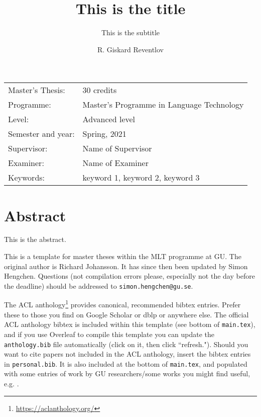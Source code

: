 \documentclass[11pt, a4paper]{article}
\title{This is the title}
\subtitle{This is the subtitle}
\author{R. Giskard Reventlov}
\begin{document}
\begin{titlepage}

\maketitle

\vfill

\begingroup
\renewcommand*{\arraystretch}{1.2}
\begin{tabular}{l@{\hskip 20mm}l}
\hline
Master's Thesis: & 30 credits \\
Programme: & Master’s Programme in Language Technology\\
Level: & Advanced level \\
Semester and year: & Spring, 2021\\
Supervisor: & Name of Supervisor\\
Examiner: & Name of Examiner\\
Keywords: & keyword 1, keyword 2, keyword 3
\end{tabular}
\endgroup

\thispagestyle{empty}
\end{titlepage}

\newpage
\singlespacing
\section*{Abstract}


This is the abstract.

This is a template for master theses within the MLT programme at GU. The original author is Richard Johansson. It has since then been updated by Simon Hengchen. Questions (not compilation errors please, especially not the day before the deadline) should be addressed to \texttt{simon.hengchen@gu.se}.

The ACL anthology\footnote{\url{https://aclanthology.org/}} provides canonical, recommended bibtex entries. Prefer these to those you find on Google Scholar or dblp or anywhere else. The official ACL anthology bibtex is included within this template (see bottom of \texttt{main.tex}), and if you use Overleaf to compile this template you can update the \texttt{anthology.bib} file automatically (click on it, then click ``refresh."). Should you want to cite papers not included in the ACL anthology, insert the bibtex entries in \texttt{personal.bib}. It is also included at the bottom of \texttt{main.tex}, and populated with some entries of work by GU researchers/some works you might find useful, e.g. \citet{harris1954distributional, sahlgren2008distributional, saussure1916, Kubhist, adesam2020superlim, eide2016swedish, hengchen-tahmasebi-2021-supersim}.
\end{document}
